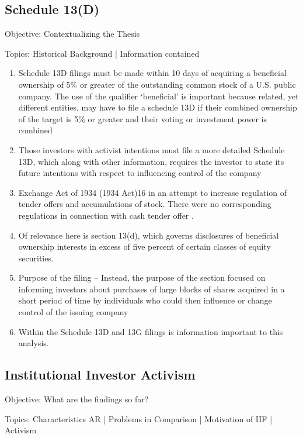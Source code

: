 \documentclass[12pt]{article}
\begin{document}
\subsection{Schedule 13(D)}
\begin{center}
Objective: Contextualizing the Thesis
\end{center}
Topics: Historical Background | Information contained

	\begin{enumerate}


		\item Schedule 13D filings must be made within 10 days of acquiring a beneficial ownership of 5\% or greater of the outstanding common stock of a U.S. public company. The use of the qualifier ‘beneficial’ is important because related, yet different entities, may have to file a schedule 13D if their combined ownership of the target is 5\% or greater and their voting or investment power is combined \citep{Brigida2012}

		\item Those investors with activist intentions must file a more detailed Schedule 13D, which along with other information, requires the investor to state its future intentions with respect to influencing control of the company \citep{Giglia2018}

		\item Exchange Act of 1934 (1934 Act)16 in an attempt to increase regulation of tender offers and accumulations of stock. There were no corresponding regulations in connection with cash tender offer \citep{Giglia2018}.

        \item Of relevance here is section 13(d), which governs disclosures of beneficial ownership interests in excess of five percent of certain classes of equity securities. \citep{Giglia2018}

		\item Purpose of the filing -- Instead, the purpose of the section focused on informing investors about purchases of large blocks of shares acquired in a short period of time by individuals who could then influence or change control of the issuing company \citep{Giglia2018}
		
		\item Within the Schedule 13D and 13G filings is information important to this analysis. \citep{Brigida2012}
	\end{enumerate}

\subsection{Institutional Investor Activism}
\begin{center}
Objective: What are the findings so far?
\end{center}
Topics: Characteristics AR | Problems in Comparison | Motivation of HF | Activism
\end{document}
